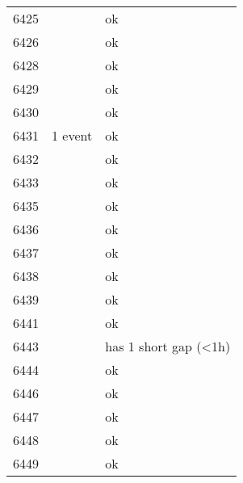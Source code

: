 \begin{longtable}{p{1cm}p{7cm}p{7cm}}
6425 &  & ok \\
6426 &  & ok \\
6428 &  & ok \\
6429 &  & ok \\
6430 &  & ok \\
6431 & 1 event & ok \\
6432 &  & ok \\
6433 &  & ok \\
6435 &  & ok \\
6436 &  & ok \\
6437 &  & ok \\
6438 &  & ok \\
6439 &  & ok \\
6441 &  & ok \\
6443 &  & has 1 short gap (<1h) \\
6444 &  & ok \\
6446 &  & ok \\
6447 &  & ok \\
6448 &  & ok \\
6449 &  & ok \\
\end{longtable}
